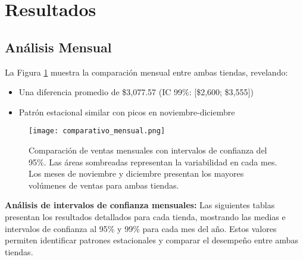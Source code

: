 \documentclass[12pt]{article}
\begin{document}
\section{Resultados}

\subsection{Análisis Mensual}

La Figura \ref{fig:comp_mensual} muestra la comparación mensual entre ambas tiendas, revelando:

\begin{itemize}
    \item Una diferencia promedio de \$3,077.57 (IC 99\%: [\$2,600; \$3,555])
    \item Patrón estacional similar con picos en noviembre-diciembre
\end{itemize}

\begin{figure}[H]
\centering
\texttt{[image: comparativo\_mensual.png]}
\caption{Comparación de ventas mensuales con intervalos de confianza del 95\%. Las áreas sombreadas representan la variabilidad en cada mes. Los meses de noviembre y diciembre presentan los mayores volúmenes de ventas para ambas tiendas.}
\label{fig:comp_mensual}
\end{figure}

\textbf{Análisis de intervalos de confianza mensuales:} Las siguientes tablas presentan los resultados detallados para cada tienda, mostrando las medias e intervalos de confianza al 95\% y 99\% para cada mes del año. Estos valores permiten identificar patrones estacionales y comparar el desempeño entre ambas tiendas.
\end{document}
